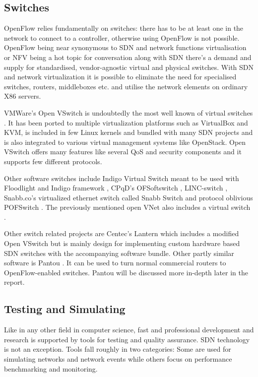 \documentclass[english]{tktltiki2}
\theoremstyle{definition}
\theoremstyle{remark}
\begin{document}
\clearpage
\subsection{Switches}

OpenFlow relies fundamentally on switches: there has to be at least one in the network to connect to a controller, otherwise using OpenFlow is not possible. OpenFlow being near synonymous to SDN and network functions virtualisation or NFV being a hot topic for conversation along with SDN there’s a demand and supply for standardised, vendor-agnostic virtual and physical switches. With SDN and network virtualization it is possible to eliminate the need for specialised switches, routers, middleboxes etc. and utilise the network elements on ordinary X86 servers.

VMWare’s Open VSwitch is undoubtedly the most well known of virtual switches \cite{VSwitch}. It has been ported to multiple virtualization platforms such as VirtualBox
and KVM, is included in few Linux kernels and bundled with many SDN projects and is also integrated to various virtual management systems like OpenStack. Open VSwitch offers many features like several QoS and security components and it supports few different protocols.

Other software switches include Indigo Virtual Switch meant to be used with Floodlight and Indigo framework \cite{IndigoSwitch}, CPqD’s OFSoftswitch \cite{OfSwitch}, LINC-switch \cite{LINC}, Snabb.co’s virtualized ethernet switch called Snabb Switch \cite{Snabb} and protocol oblivious POFSwitch \cite{POFSwitch}. The previously mentioned open VNet also includes a virtual switch \cite{VNet}. 

Other switch related projects are Centec’s Lantern \cite{Lantern} which includes a modified Open VSwitch but is mainly design for implementing custom  hardware based SDN switches with the accompanying software bundle. Other partly similar software is Pantou \cite{Yia04}. It can be used to turn normal commercial routers to OpenFlow-enabled switches. Pantou will be discussed more in-depth later in the report.

\subsection{Testing and Simulating}

Like in any other field in computer science, fast and professional development and research is supported by tools for testing and quality assurance. SDN technology is not an exception. Tools fall roughly in two categories: Some are used for simulating networks and network events while others focus on performance benchmarking and monitoring.
\end{document}
